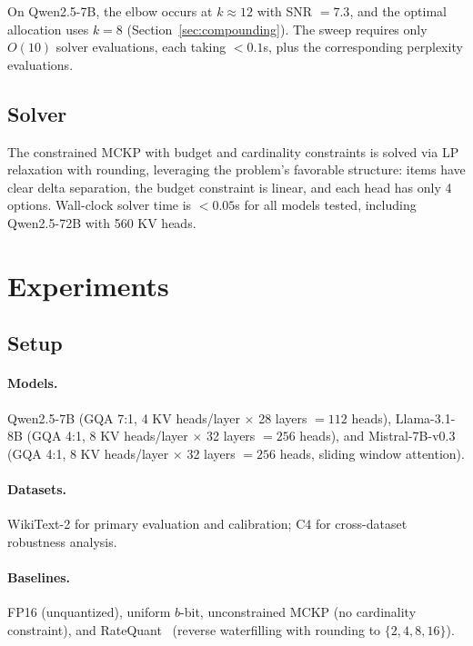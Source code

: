 \documentclass[11pt,a4paper]{article}
\begin{document}
On Qwen2.5-7B, the elbow occurs at $k \approx 12$ with SNR $= 7.3$, and the optimal allocation uses $k = 8$ (Section~\ref{sec:compounding}).
The sweep requires only $O(10)$ solver evaluations, each taking $< 0.1$s, plus the corresponding perplexity evaluations.

\subsection{Solver}

The constrained MCKP with budget and cardinality constraints is solved via LP relaxation with rounding, leveraging the problem's favorable structure: items have clear delta separation, the budget constraint is linear, and each head has only 4 options.
Wall-clock solver time is $< 0.05$s for all models tested, including Qwen2.5-72B with 560 KV heads.

\section{Experiments}

\subsection{Setup}

\paragraph{Models.} Qwen2.5-7B (GQA 7:1, 4 KV heads/layer $\times$ 28 layers $= 112$ heads), Llama-3.1-8B (GQA 4:1, 8 KV heads/layer $\times$ 32 layers $= 256$ heads), and Mistral-7B-v0.3 (GQA 4:1, 8 KV heads/layer $\times$ 32 layers $= 256$ heads, sliding window attention).

\paragraph{Datasets.} WikiText-2 for primary evaluation and calibration; C4 for cross-dataset robustness analysis.

\paragraph{Baselines.} FP16 (unquantized), uniform $b$-bit, unconstrained MCKP (no cardinality constraint), and RateQuant~\cite{ratequant2026} (reverse waterfilling with rounding to $\{2,4,8,16\}$).
\end{document}
